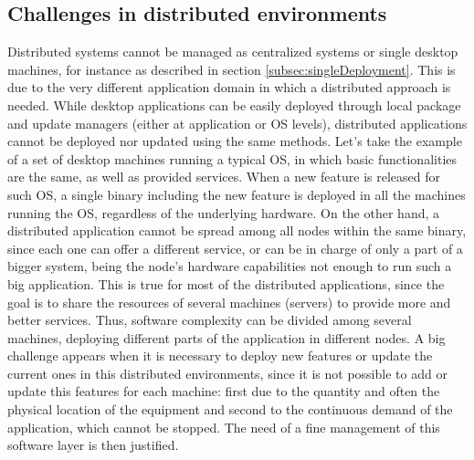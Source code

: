\subsection{Challenges in distributed environments}
Distributed systems cannot be managed as centralized systems or single desktop machines, for instance as described in section \ref{subsec:singleDeployment}.
This is due to the very different application domain in which a distributed approach is needed.
While desktop applications can be easily deployed through local package and update managers (either at application or OS levels), distributed applications cannot be deployed nor updated using the same methods.
Let's take the example of a set of desktop machines running a typical OS, in which basic functionalities are the same, as well as provided services.
When a new feature is released for such OS, a single binary including the new feature is deployed in all the machines running the OS, regardless of the underlying hardware.
On the other hand, a distributed application cannot be spread among all nodes within the same binary, since each one can offer a different service, or can be in charge of only a part of a bigger system, being the node's hardware capabilities not enough to run such a big application.
This is true for most of the distributed applications, since the goal is to share the resources of several machines (servers) to provide more and better services.
Thus, software complexity can be divided among several machines, deploying different parts of the application in different nodes.
A big challenge appears when it is necessary to deploy new features or update the current ones in this distributed environments, since it is not possible to add or update this features for each machine: first due to the quantity and often the physical location of the equipment and second to the continuous demand of the application, which cannot be stopped.
The need of a fine management of this software layer is then justified.

